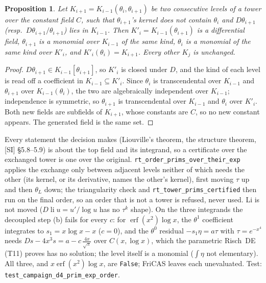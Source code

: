 \documentclass[11pt]{article}
\newtheorem{proposition}[theorem]{Proposition}
\theoremstyle{definition}
\theoremstyle{remark}
\newcommand{\code}[1]{\texttt{#1}}
\begin{document}
\begin{proposition}\label{prop:T20a}
Let $K_{i+1}=K_{i-1}(\theta_i,\theta_{i+1})$ be two consecutive levels of a tower over the
constant field $C$, such that $\theta_{i+1}$'s kernel does not contain $\theta_i$ and
$D\theta_{i+1}$ (resp.\ $D\theta_{i+1}/\theta_{i+1}$) lies in $K_{i-1}$. Then
$K'_i=K_{i-1}(\theta_{i+1})$ is a differential field, $\theta_{i+1}$ is a monomial over $K_{i-1}$
of the same kind, $\theta_i$ is a monomial of the same kind over $K'_i$, and
$K'_i(\theta_i)=K_{i+1}$. Every other $K_j$ is unchanged.
\end{proposition}
\begin{proof}
$D\theta_{i+1}\in K_{i-1}[\theta_{i+1}]$, so $K'_i$ is closed under $D$, and the kind of each
level is read off a coefficient in $K_{i-1}\subseteq K'_i$. Since $\theta_i$ is transcendental over
$K_{i-1}$ and $\theta_{i+1}$ over $K_{i-1}(\theta_i)$, the two are algebraically independent over
$K_{i-1}$; independence is symmetric, so $\theta_{i+1}$ is transcendental over $K_{i-1}$ and
$\theta_i$ over $K'_i$. Both new fields are subfields of $K_{i+1}$, whose constants are $C$, so no
new constant appears. The generated field is the same set.
\end{proof}
\noindent Every statement the decision makes (Liouville's theorem, the structure theorem,
[SI] \S5.8--5.9) is about the top field and its integrand, so a certificate over the
exchanged tower is one over the original. \code{rt\_order\_prims\_over\_their\_exp} applies
the exchange only between adjacent levels neither of which needs the other (its kernel, or
its derivative, names the other's kernel), first moving $\tau$ up and then $\theta_L$ down; the
triangularity check and \code{rt\_tower\_prims\_certified} then run on the final order, so an
order that is not a tower is refused, never used. Li is not moved ($D\operatorname{li}u=u'/\log u$
has no $\tau^k$ shape). On the three integrands the decoupled step (b) fails for every $c$:
for $\operatorname{erf}(x^2)\log x$, the $\theta^1$ coefficient integrates to $s_1=x\log x-x$
($c=0$), and the $\theta^0$ residual $-s_1\eta=a\tau$ with $\tau=e^{-x^4}$ needs
$Ds-4x^3s=a-c\,\frac{4x}{\sqrt\pi}$ over $C(x,\log x)$, which the parametric Risch~DE (T11)
proves has no solution; the level itself is a monomial ($\int\eta$ not elementary). All
three, and $x\operatorname{erf}(x^2)\log x$, are \code{False}; FriCAS leaves each unevaluated.
Test: \code{test\_campaign\_d4\_prim\_exp\_order}.
\end{document}
